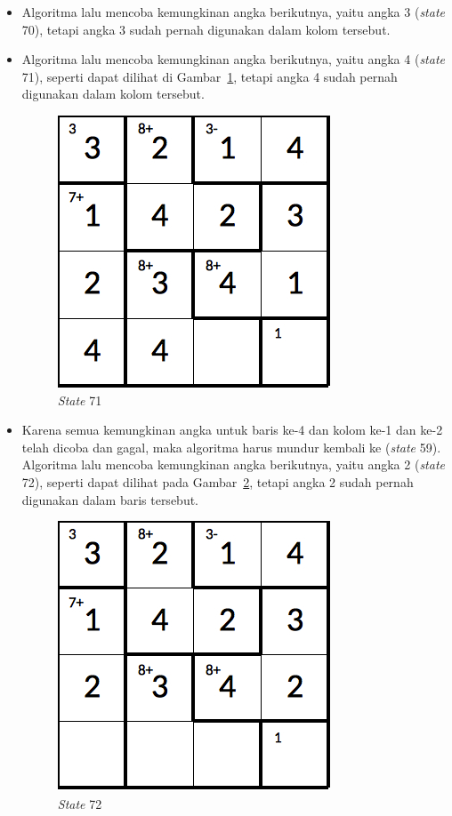 \documentclass[a4paper,twoside]{article}
\begin{document}
\begin{enumerate}
\begin{itemize}
\item Algoritma lalu mencoba kemungkinan angka berikutnya, yaitu angka 3 (\textit{state} 70), tetapi angka 3 sudah pernah digunakan dalam kolom tersebut.
\item Algoritma lalu mencoba kemungkinan angka berikutnya, yaitu angka 4 (\textit{state} 71), seperti dapat dilihat di Gambar~\ref{fig:analisisbt20}, tetapi angka 4 sudah pernah digunakan dalam kolom tersebut.

\begin{figure}
\centering
\captionsetup{justification=centering}
\includegraphics[scale=0.333]{Gambar/backtracking/State71}
\caption[\textit{State} 71]{\textit{State} 71}
\label{fig:analisisbt20}
\end{figure}

\item Karena semua kemungkinan angka untuk baris ke-4 dan kolom ke-1 dan ke-2 telah dicoba dan gagal, maka algoritma harus mundur kembali ke (\textit{state} 59). Algoritma lalu mencoba kemungkinan angka berikutnya, yaitu angka 2 (\textit{state} 72), seperti dapat dilihat pada Gambar~\ref{fig:analisisbt21}, tetapi angka 2 sudah pernah digunakan dalam baris tersebut.

\begin{figure}
\centering
\captionsetup{justification=centering}
\includegraphics[scale=0.333]{Gambar/backtracking/State72}
\caption[\textit{State} 72]{\textit{State} 72}
\label{fig:analisisbt21}
\end{figure}


\end{itemize}
\end{enumerate}
\end{document}
